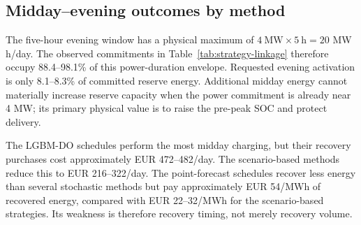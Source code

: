 \documentclass[11pt,a4paper]{article}
\begin{document}
\subsection{Midday--evening outcomes by method}

\begin{table}[htbp]
  \centering
  \small
  \caption{Market-only mean daily linkage outcomes on 206 common
  forecast-complete days (authors' calculations).}
  \label{tab:strategy-linkage}
\end{table}

The five-hour evening window has a physical maximum of
$4\ \mathrm{MW}\times5\ \mathrm{h}=20$ MW h/day.  The observed commitments in
Table~\ref{tab:strategy-linkage} therefore occupy 88.4--98.1\% of this
power-duration envelope.  Requested evening activation is only 8.1--8.3\% of
committed reserve energy.  Additional midday energy cannot materially increase
reserve capacity when the power commitment is already near 4 MW; its primary
physical value is to raise the pre-peak SOC and protect delivery.

The LGBM-DO schedules perform the most midday charging, but
their recovery purchases cost
approximately EUR 472--482/day.  The scenario-based methods reduce this to
EUR 216--322/day.  The point-forecast schedules recover less energy than
several stochastic methods but
pay approximately EUR 54/MWh of recovered energy, compared with EUR 22--32/MWh
for the scenario-based strategies.  Its weakness is therefore recovery timing,
not merely recovery volume.
\end{document}
